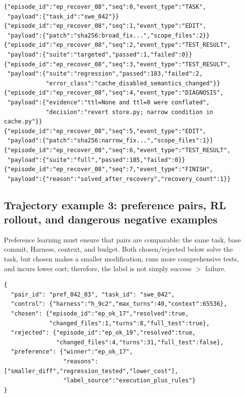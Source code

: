 \documentclass[10pt,a4paper,UTF8,fontset=none]{ctexart}
\begin{document}
\begin{lstlisting}[style=codeblock,caption={Recovery trajectory in which an erroneous patch is corrected using regression feedback},label={en:lst:trajectory-recovery}]
{"episode_id":"ep_recover_08","seq":0,"event_type":"TASK",
 "payload":{"task_id":"swe_042"}}
{"episode_id":"ep_recover_08","seq":1,"event_type":"EDIT",
 "payload":{"patch":"sha256:broad_fix...","scope_files":2}}
{"episode_id":"ep_recover_08","seq":2,"event_type":"TEST_RESULT",
 "payload":{"suite":"targeted","passed":1,"failed":0}}
{"episode_id":"ep_recover_08","seq":3,"event_type":"TEST_RESULT",
 "payload":{"suite":"regression","passed":183,"failed":2,
            "error_class":"cache_disabled_semantics_changed"}}
{"episode_id":"ep_recover_08","seq":4,"event_type":"DIAGNOSIS",
 "payload":{"evidence":"ttl=None and ttl=0 were conflated",
            "decision":"revert store.py; narrow condition in cache.py"}}
{"episode_id":"ep_recover_08","seq":5,"event_type":"EDIT",
 "payload":{"patch":"sha256:narrow_fix...","scope_files":1}}
{"episode_id":"ep_recover_08","seq":6,"event_type":"TEST_RESULT",
 "payload":{"suite":"full","passed":185,"failed":0}}
{"episode_id":"ep_recover_08","seq":7,"event_type":"FINISH",
 "payload":{"reason":"solved_after_recovery","recovery_count":1}}
\end{lstlisting}

\subsection{Trajectory example 3: preference pairs, RL rollout, and dangerous negative examples}

Preference learning must ensure that pairs are comparable: the same task, base commit, Harness, context, and budget. Both chosen/rejected below solve the task, but chosen makes a smaller modification, runs more comprehensive tests, and incurs lower cost; therefore, the label is not simply success $>$ failure.

\begin{lstlisting}[style=codeblock,caption={Preference pair of trajectories for the same task},label={en:lst:trajectory-preference}]
{
  "pair_id": "pref_042_03", "task_id": "swe_042",
  "control": {"harness":"h_9c2","max_turns":40,"context":65536},
  "chosen": {"episode_id":"ep_ok_17","resolved":true,
             "changed_files":1,"turns":8,"full_test":true},
  "rejected": {"episode_id":"ep_ok_19","resolved":true,
               "changed_files":4,"turns":31,"full_test":false},
  "preference": {"winner":"ep_ok_17",
                 "reasons":["smaller_diff","regression_tested","lower_cost"],
                 "label_source":"execution_plus_rules"}
}
\end{lstlisting}
\end{document}

